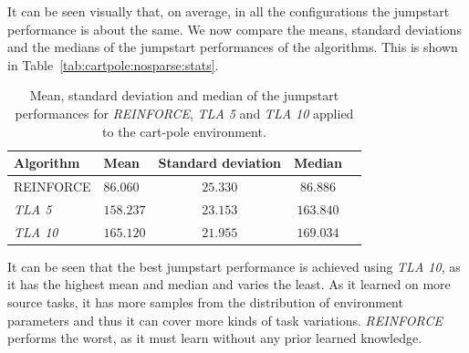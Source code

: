 It can be seen visually that, on average, in all the configurations the jumpstart performance is about the same. We now compare the means, standard deviations and the medians of the jumpstart performances of the algorithms. This is shown in Table~\ref{tab:cartpole:nosparse:stats}.
\begin{table}[htb]
    \centering
    \begin{tabular}{llccc}
    \hline
    Algorithm & Mean & Standard deviation & Median \\
    \hline
       REINFORCE  & $86.060$ & $25.330$ & $86.886$ \\
       \textit{TLA 5} & $158.237$ & $23.153$ & $163.840$ \\
       \textit{TLA 10} & $\bm{165.120}$ & $\bm{21.955}$ & $\bm{169.034}$ \\
    \hline
    \end{tabular}
    \caption{Mean, standard deviation and median of the jumpstart performances for \textit{REINFORCE}, \textit{TLA 5} and \textit{TLA 10} applied to the cart-pole environment.}
    \label{tab:nosparse:stats}
\end{table}
It can be seen that the best jumpstart performance is achieved using \textit{TLA 10}, as it has the highest mean and median and varies the least. As it learned on more source tasks, it has more samples from the distribution of environment parameters and thus it can cover more kinds of task variations. \textit{REINFORCE} performs the worst, as it must learn without any prior learned knowledge.

